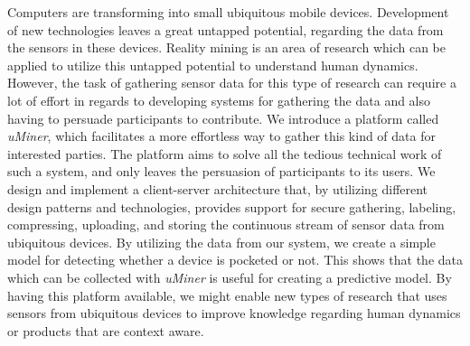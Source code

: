 
Computers are transforming into small ubiquitous mobile devices. Development of new technologies leaves a great untapped potential, regarding the data from the sensors in these devices. 
Reality mining is an area of research which can be applied to utilize this untapped potential to understand human dynamics. However, the task of gathering sensor data for this type of research can require a lot of effort in regards to developing systems for gathering the data and also having to persuade participants to contribute.
We introduce a platform called \emph{uMiner}, which facilitates a more effortless way to gather this kind of data for interested parties. The platform aims to solve all the tedious technical work of such a system, and only leaves the persuasion of participants to its users.
We design and implement a client-server architecture that, by utilizing different design patterns and technologies, provides support for secure gathering, labeling, compressing, uploading, and storing the continuous stream of sensor data from ubiquitous devices. 
By utilizing the data from our system, we create a simple model for detecting whether a device is pocketed or not. This shows that the data which can be collected with \emph{uMiner} is useful for creating a predictive model.  
By having this platform available, we might enable new types of research that uses sensors from ubiquitous devices to improve knowledge regarding human dynamics or products that are context aware.
